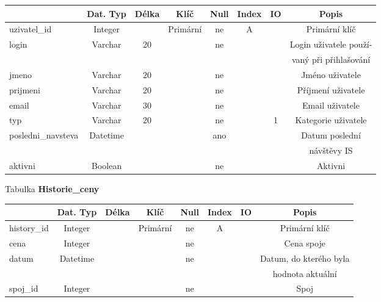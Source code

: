 \documentclass[11pt]{article}
\begin{document}
\begin{table}[H]
    \begin{tabular}{|l|c|c|c|c|c|c|c|} \hline
                            & Dat. Typ  & Délka & Klíč      & Null  & Index & IO    & Popis \\ \hline
        uzivatel\_id	    & Integer	&	    & Primární	& ne	& A		&       & Primární klíč \\ \hline
        login	            & Varchar	& 20	& 	        & ne	&	    & 	    & Login uživatele použí-\\ &&&&&&& vaný při přihlašování \\ \hline
        jmeno	            & Varchar	& 20	& 	        & ne	&	    & 	    & Jméno uživatele \\ \hline
        prijmeni	        & Varchar	& 20	& 	        & ne	&	    & 	    & Příjmení uživatele \\ \hline
        email	            & Varchar	& 30	& 	        & ne	&	    & 	    & Email uživatele \\ \hline
        typ	                & Varchar	& 20	& 	        & ne	&	    & 1     & Kategorie uživatele \\ \hline
        posledni\_navsteva	& Datetime	& 		&           & ano	&		&       & Datum poslední\\ &&&&&&& návštěvy IS \\ \hline
        aktivni	            & Boolean	&		&           & ne	&		&       & Aktivni \\ \hline
    \end{tabular}
\end{table}

\noindent
Tabulka \textbf{Historie\_ceny}

\begin{table}[H]
    \begin{tabular}{|l|c|c|c|c|c|c|c|} \hline
                    & Dat. Typ  & Délka & Klíč      & Null  & Index & IO    & Popis \\ \hline
        history\_id	& Integer	&	    & Primární	& ne	& A		&       & Primární klíč \\ \hline
        cena	    & Integer	&	    & 	        & ne	&		&       & Cena spoje \\ \hline
        datum	    & Datetime	&	    & 	        & ne	&		&       & Datum, do kterého byla\\ &&&&&&& hodnota aktuální \\ \hline
        spoj\_id	& Integer	&	    & 	        & ne	&		&       & Spoj \\ \hline
    \end{tabular}
\end{table}
\end{document}
